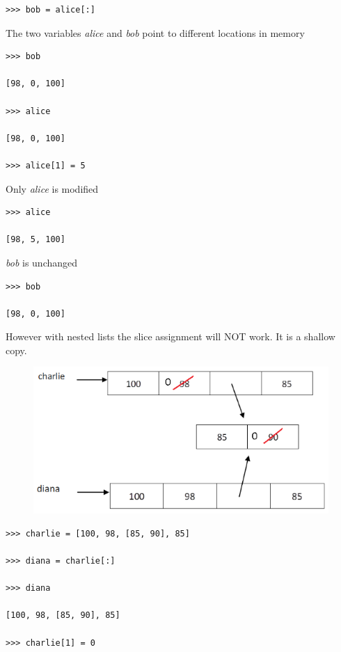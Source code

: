 \documentclass{article}
\begin{document}
\begin{lstlisting}
>>> bob = alice[:]          

\end{lstlisting}

The two variables \textit{alice} and \textit{bob} point to different locations in memory

\begin{lstlisting}
>>> bob

[98, 0, 100]

>>> alice

[98, 0, 100]

>>> alice[1] = 5    

\end{lstlisting}

Only \textit{alice} is modified
\begin{lstlisting}
>>> alice

[98, 5, 100]

\end{lstlisting}

\textit{bob} is unchanged

\begin{lstlisting}
>>> bob

[98, 0, 100]

\end{lstlisting}

However with nested lists the slice assignment will NOT work.  It is a shallow copy.

\begin{figure}[h]
\includegraphics[scale=.745]{charlie}\\
\end{figure}

\begin{lstlisting}
>>> charlie = [100, 98, [85, 90], 85]

>>> diana = charlie[:]

>>> diana

[100, 98, [85, 90], 85]

>>> charlie[1] = 0
\end{lstlisting}
\end{document}
